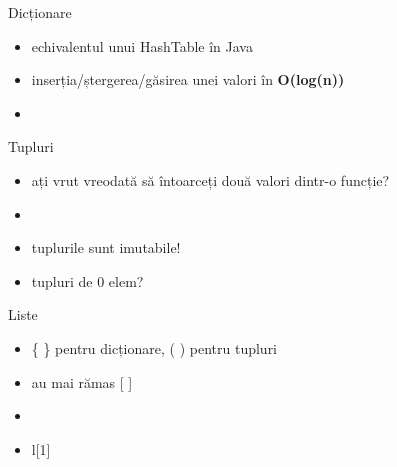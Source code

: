 \documentclass{beamer}
\begin{document}
\begin{frame}{Dicționare}
  \begin{itemize}
  \item echivalentul unui HashTable în Java
  \item inserția/ștergerea/găsirea unei valori în \textbf{O(log(n))}
  \item \small 
  \end{itemize}
\end{frame}



\begin{frame}{Tupluri}
  \begin{itemize}
  \item ați vrut vreodată să întoarceți două valori dintr-o funcție?
  \item  \small 
  \item tuplurile sunt imutabile!
  \item tupluri de 0 elem?
  \end{itemize}
\end{frame}


\begin{frame}{Liste}
  \begin{itemize}
  \item \{ \} pentru dicționare, ( ) pentru tupluri
  \item au mai rămas [ ]
  \item \small 
  \item l[1]
  \end{itemize}
\end{frame}
\end{document}

